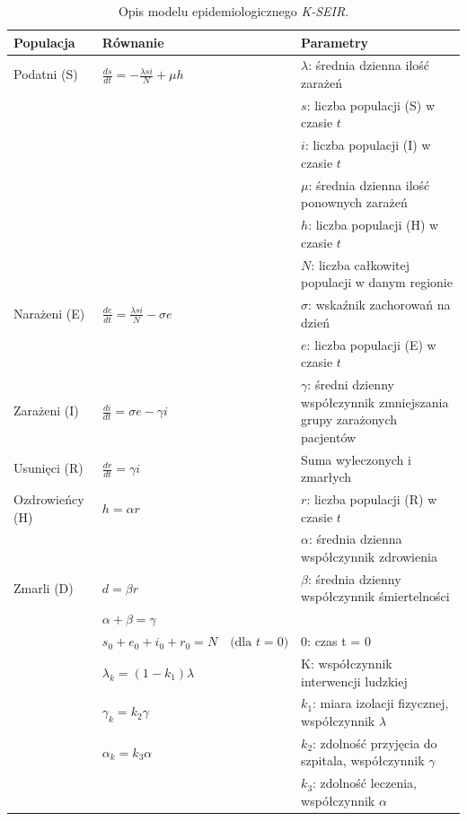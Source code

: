 \begin{table}[h!]

	\centering
	\caption{Opis modelu epidemiologicznego  \textit {K-SEIR}.}
	\label{tab:model_epidemiologiczny}
	\begin{tabular}{|p{3cm}|p{7cm}|p{5cm}|}
		\hline
		\textbf{Populacja} & \textbf{Równanie} & \textbf{Parametry} \\
		\hline
		Podatni (S) & $\frac{ds}{dt} = -\frac{\lambda si}{N} + \mu h$ & $\lambda$: średnia dzienna ilość zarażeń \\
		& & $s$: liczba populacji (S) w czasie $t$ \\
		& & $i$: liczba populacji (I) w czasie $t$ \\
		& & $\mu$: średnia dzienna ilość ponownych zarażeń \\
		& & $h$: liczba populacji (H) w czasie $t$ \\
		& & $N$: liczba całkowitej populacji w danym regionie \\
		\hline
		Narażeni (E) & $\frac{de}{dt} = \frac{\lambda si}{N} - \sigma e$ & $\sigma$: wskaźnik zachorowań na dzień \\
		& & $e$: liczba populacji (E) w czasie $t$ \\
		\hline
		Zarażeni (I) & $\frac{di}{dt} = \sigma e - \gamma i$ & $\gamma$: średni dzienny współczynnik zmniejszania grupy zarażonych pacjentów \\
		\hline
		Usunięci (R) & $\frac{dr}{dt} = \gamma i$ & Suma wyleczonych i zmarłych \\
		\hline
		Ozdrowieńcy (H) & $h = \alpha r$ & $r$: liczba populacji (R) w czasie $t$ \\
		& & $\alpha$: średnia dzienna współczynnik zdrowienia \\
		\hline
		Zmarli (D) & $d = \beta r$ & $\beta$: średnia dzienny współczynnik śmiertelności \\
		\cline{2-3}
		& $\alpha + \beta = \gamma$ & \\
		\cline{2-3}
		& $s_0 + e_0 + i_0 + r_0 = N \quad \text{(dla } t = 0)$ & 0: czas t = 0 \\
		\cline{2-3}
		& $\lambda_k = (1 - k_1) \lambda$ & K: współczynnik interwencji ludzkiej \\
		& $\gamma_k = k_2 \gamma$ & $k_1$: miara izolacji fizycznej, współczynnik $\lambda$ \\
		& $\alpha_k = k_3 \alpha$ & $k_2$: zdolność przyjęcia do szpitala, współczynnik $\gamma$ \\
								  & &	$k_3$: zdolność leczenia, współczynnik $\alpha$ \\
		\hline
	\end{tabular}
\end{table}


